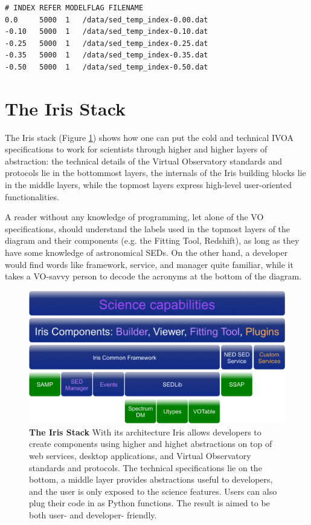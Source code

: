 \documentclass[final,5p]{elsarticle}
\begin{document}
\begin{lstlisting}[style=code,
	caption=Example of template library definition file,
	label=lst:templateconfig]
# INDEX REFER MODELFLAG FILENAME
0.0     5000  1   /data/sed_temp_index-0.00.dat
-0.10   5000  1   /data/sed_temp_index-0.10.dat
-0.25   5000  1   /data/sed_temp_index-0.25.dat
-0.35   5000  1   /data/sed_temp_index-0.35.dat
-0.50   5000  1   /data/sed_temp_index-0.50.dat
\end{lstlisting}


\section{The Iris Stack}
\label{sec:stack}

The Iris stack (Figure \ref{fig:stack}) shows how one can put the cold and technical IVOA specifications to work for scientists through higher and higher layers of abstraction: the technical details of the Virtual Observatory standards and protocols lie in the bottommost layers, the internals of the Iris building blocks lie in the middle layers, while the topmost layers express high-level user-oriented functionalities.

A reader without any knowledge of programming, let alone of the VO specifications, should understand the labels used in the topmost layers of the diagram and their components (e.g. the Fitting Tool, Redshift), as long as they have some knowledge of astronomical SEDs. On the other hand, a developer would find words like framework, service, and manager quite familiar, while it takes a VO-savvy person to decode the acronyms at the bottom of the diagram.

\begin{figure}
\begin{center}
\includegraphics[width=\columnwidth]{figures/IrisStack.png}
\caption{\textbf{The Iris Stack} With its architecture Iris allows developers to create components using higher and highet abstractions on top of web services, desktop applications, and Virtual Observatory standards and protocols. The technical specifications lie on the bottom, a middle layer provides abstractions useful to developers, and the user is only exposed to the science features. Users can also plug their code in as Python functions. The result is aimed to be both user- and developer- friendly.}
\label{fig:stack}
\end{center}
\end{figure}
\end{document}
